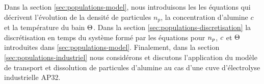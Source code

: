 Dans la section \ref{sec:populations-model}, nous introduisons les
les équations qui décrivent l'évolution de la densité de
particules $n_p$, la concentration d'alumine $c$ et la température
du bain $\Theta$. Dans la section
\ref{sec:populations-discretisation} la discrétisation en temps du
système formé par les équations pour $n_p$, $c$
et $\Theta$ introduites dans
\ref{sec:populations-model}. Finalement, dans la section
\ref{sec:populations-industriel} nous considérons et discutons
l'application du modèle de transport et dissolution de particules
d'alumine au cas d'une cuve d'électrolyse industrielle AP32.
